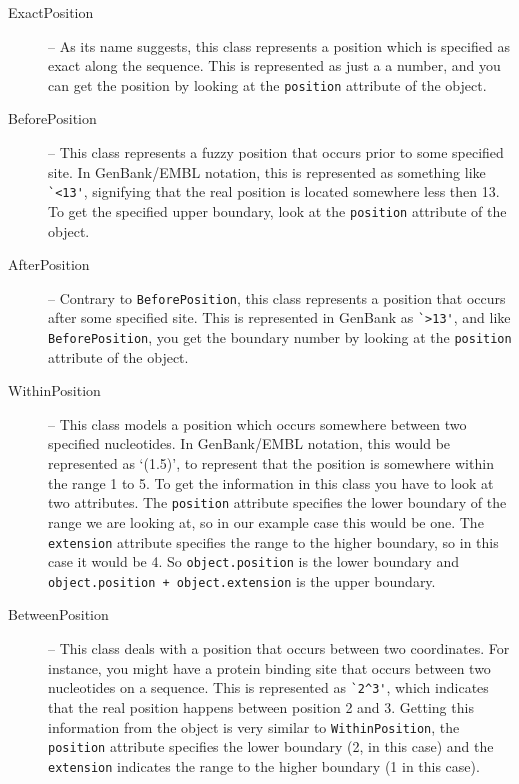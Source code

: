 \documentclass{report}
\begin{document}
\begin{description}
  \item[ExactPosition] -- As its name suggests, this class represents a position which is specified as exact along the sequence. This is represented as just a a number, and you can get the position by looking at the \verb|position| attribute of the object.

  \item[BeforePosition] -- This class represents a fuzzy position
  that occurs prior to some specified site. In GenBank/EMBL notation,
  this is represented as something like \verb|`<13'|, signifying that
  the real position is located somewhere less then 13. To get
  the specified upper boundary, look at the \verb|position|
  attribute of the object.

  \item[AfterPosition] -- Contrary to \verb|BeforePosition|, this
  class represents a position that occurs after some specified site.
  This is represented in GenBank as \verb|`>13'|, and like
  \verb|BeforePosition|, you get the boundary number by looking
  at the \verb|position| attribute of the object.

  \item[WithinPosition] -- This class models a position which occurs somewhere between two specified nucleotides. In GenBank/EMBL notation, this would be represented as `(1.5)', to represent that the position is somewhere within the range 1 to 5. To get the information in this class you have to look at two attributes. The \verb|position| attribute specifies the lower boundary of the range we are looking at, so in our example case this would be one. The \verb|extension| attribute specifies the range to the higher boundary, so in this case it would be 4. So \verb|object.position| is the lower boundary and \verb|object.position + object.extension| is the upper boundary.

  \item[BetweenPosition] -- This class deals with a position that
  occurs between two coordinates. For instance, you might have a
  protein binding site that occurs between two nucleotides on a
  sequence. This is represented as \verb|`2^3'|, which indicates that
  the real position happens between position 2 and 3. Getting
  this information from the object is very similar to
  \verb|WithinPosition|, the \verb|position| attribute specifies
  the lower boundary (2, in this case) and the \verb|extension|
  indicates the range to the higher boundary (1 in this case).
\end{description}
\end{document}
